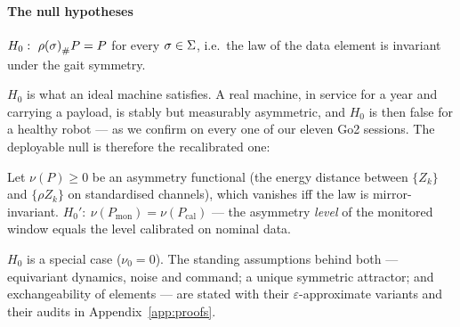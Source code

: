 \paragraph{The null hypotheses}
\begin{definition}
\label{def:h0}
$H_0:\ {\rho(\sigma)}_{\#}P=P$ for every $\sigma\in\Sigma$, i.e.\ the law of the data element is invariant under the
gait symmetry.
\end{definition}
$H_0$ is what an ideal machine satisfies. A real machine, in service for a year and carrying a payload, is stably but
measurably asymmetric, and $H_0$ is then false for a healthy robot --- as we confirm on every one of our eleven Go2
sessions. The deployable null is therefore the recalibrated one:
\begin{definition}
\label{def:h0prime}
Let $\nu(P)\ge 0$ be an asymmetry functional (the energy distance between $\{Z_k\}$ and $\{\rho Z_k\}$ on standardised
channels), which vanishes iff the law is mirror-invariant. $H_0':\ \nu(P_{\mathrm{mon}})=\nu(P_{\mathrm{cal}})$ --- the
asymmetry \emph{level} of the monitored window equals the level calibrated on nominal data.
\end{definition}
$H_0$ is a special case ($\nu_0=0$). The standing assumptions behind both --- equivariant dynamics, noise and command;
a unique symmetric attractor; and exchangeability of elements --- are stated with their $\varepsilon$-approximate
variants and their audits in Appendix~\ref{app:proofs}.
